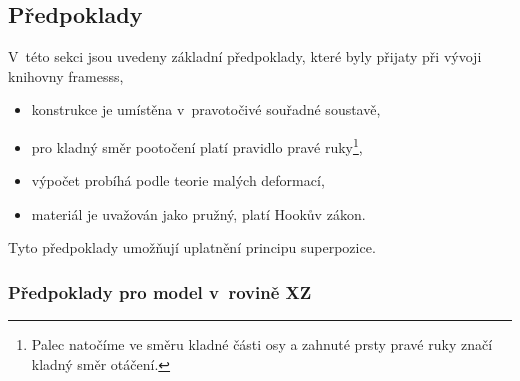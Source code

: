 \subsection{Předpoklady}

V~této sekci jsou uvedeny základní předpoklady, které byly přijaty při vývoji knihovny framesss,
\begin{itemize}
    \item konstrukce je umístěna v~pravotočivé souřadné soustavě,
    \item pro kladný směr pootočení platí pravidlo pravé ruky\footnote{Palec natočíme ve směru kladné části osy a zahnuté prsty pravé ruky značí kladný směr otáčení.},
    \item výpočet probíhá podle teorie malých deformací,
    \item materiál je uvažován jako pružný, platí Hookův zákon.
\end{itemize}

Tyto předpoklady umožňují uplatnění principu superpozice.

\subsubsection*{Předpoklady pro model v~rovině XZ}

